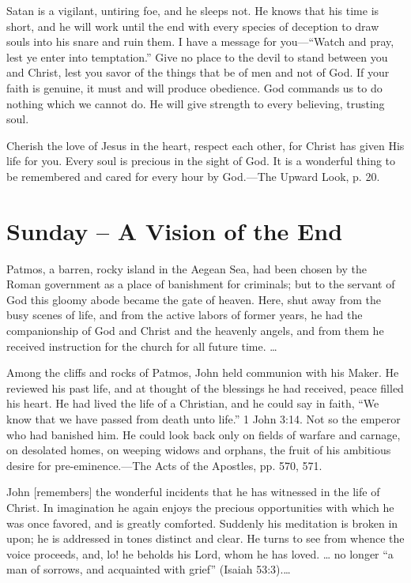 \documentclass[a4paper, 10pt, twoside, headings=small]{scrartcl}
\begin{document}
\begin{multicols}{2}
Satan is a vigilant, untiring foe, and he sleeps not. He knows that his time is short, and he will work until the end with every species of deception to draw souls into his snare and ruin them. I have a message for you—“Watch and pray, lest ye enter into temptation.” Give no place to the devil to stand between you and Christ, lest you savor of the things that be of men and not of God. If your faith is genuine, it must and will produce obedience. God commands us to do nothing which we cannot do. He will give strength to every believing, trusting soul.

Cherish the love of Jesus in the heart, respect each other, for Christ has given His life for you. Every soul is precious in the sight of God. It is a wonderful thing to be remembered and cared for every hour by God.—The Upward Look, p. 20.

\section*{Sunday – A Vision of the End}

Patmos, a barren, rocky island in the Aegean Sea, had been chosen by the Roman government as a place of banishment for criminals; but to the servant of God this gloomy abode became the gate of heaven. Here, shut away from the busy scenes of life, and from the active labors of former years, he had the companionship of God and Christ and the heavenly angels, and from them he received instruction for the church for all future time. …

Among the cliffs and rocks of Patmos, John held communion with his Maker. He reviewed his past life, and at thought of the blessings he had received, peace filled his heart. He had lived the life of a Christian, and he could say in faith, “We know that we have passed from death unto life.” 1 John 3:14. Not so the emperor who had banished him. He could look back only on fields of warfare and carnage, on desolated homes, on weeping widows and orphans, the fruit of his ambitious desire for pre-eminence.—The Acts of the Apostles, pp. 570, 571.

John [remembers] the wonderful incidents that he has witnessed in the life of Christ. In imagination he again enjoys the precious opportunities with which he was once favored, and is greatly comforted. Suddenly his meditation is broken in upon; he is addressed in tones distinct and clear. He turns to see from whence the voice proceeds, and, lo! he beholds his Lord, whom he has loved. … no longer “a man of sorrows, and acquainted with grief” (Isaiah 53:3).…


\end{multicols}
\end{document}
